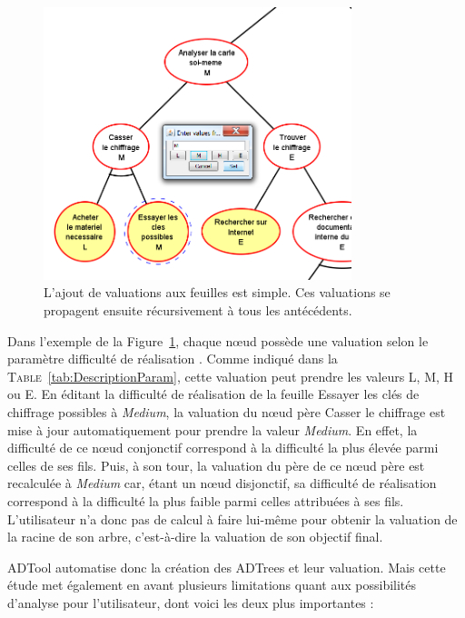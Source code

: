     \begin{figure}[h]
        \centering
        \includegraphics[width=0.8\textwidth]{figure/adtool_add_values.png}
        \caption{L'ajout de valuations aux feuilles est simple. Ces valuations se propagent ensuite récursivement à tous les antécédents.}
        \label{fig:arbre_exemple_2}
    \end{figure}
    
    Dans l'exemple de la {\sc Figure}~\ref{fig:arbre_exemple_2}, chaque nœud possède une valuation selon le paramètre \og difficulté de réalisation \fg{}. Comme indiqué dans la \textsc{Table}~\ref{tab:DescriptionParam}, cette valuation peut prendre les valeurs L, M, H ou E. En éditant la difficulté de réalisation de la feuille \og Essayer les clés de chiffrage possibles \fg{} à \emph{Medium}, la valuation du nœud père \og Casser le chiffrage \fg{} est mise à jour automatiquement pour prendre la valeur \emph{Medium}. En effet, la difficulté de ce nœud conjonctif correspond à la difficulté la plus élevée parmi celles de ses fils. Puis, à son tour, la valuation du père de ce nœud père est recalculée à \emph{Medium} car, étant un nœud disjonctif, sa difficulté de réalisation correspond à la difficulté la plus faible parmi celles attribuées à ses fils. L'utilisateur n'a donc pas de calcul à faire lui-même pour obtenir la valuation de la racine de son arbre, c'est-à-dire la valuation de son objectif final. 

    ADTool automatise donc la création des ADTrees et leur valuation. Mais cette étude met également en avant plusieurs limitations quant aux possibilités d'analyse pour l'utilisateur, dont voici les deux plus importantes :  

